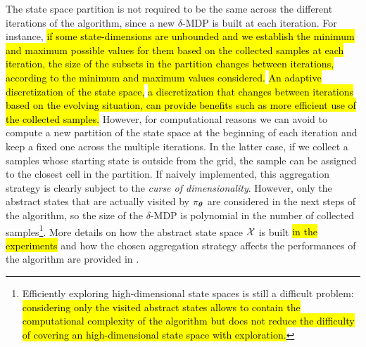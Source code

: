 \newline
The state space partition is not required to be the same across the different iterations of the algorithm, since a new $\delta$-MDP is built at each iteration. For instance, \hl{if some state-dimensions are unbounded and we establish the minimum and maximum possible values for them based on the collected samples at each iteration, the size of the subsets in the partition changes between iterations, according to the minimum and maximum values considered.} \hl{An adaptive discretization of the state space,} \ie \hl{a discretization that changes between iterations based on the evolving situation, can provide benefits such as more efficient use of the collected samples.} However, for computational reasons we can avoid to compute a new partition of the state space at the beginning of each iteration and keep a fixed one across the multiple iterations. In the latter case, if we collect a samples whose starting state is outside from the grid, the sample can be assigned to the closest cell in the partition.
If naively implemented, this aggregation strategy is clearly subject to the \textit{curse of dimensionality}. However, only the abstract states that are actually visited by $\pi_{\boldsymbol{\theta}}$ are considered in the next steps of the algorithm, so the size of the $\delta$-\ac{MDP} is polynomial in the number of collected samples\footnote{Efficiently exploring high-dimensional state spaces is still a difficult problem: \hl{considering only the visited abstract states allows to contain the computational complexity of the algorithm but does not reduce the difficulty of covering an high-dimensional state space with exploration.}}.  
More details on how the abstract state space $\mathcal{X}$ is built \hl{in the experiments} and how the chosen aggregation strategy affects the performances of the algorithm are provided in .

